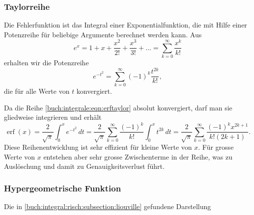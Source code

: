 \subsubsection{Taylorreihe}
Die Fehlerfunktion ist das Integral einer Exponentialfunktion, die mit
Hilfe einer Potenzreihe für beliebige Argumente berechnet werden kann.
Aus
\[
e^x
=
1+x+\frac{x^2}{2!}+\frac{x^3}{3!} + \dots
=
\sum_{k=0}^\infty \frac{x^k}{k!}
\]
erhalten wir die Potenzreihe
\begin{equation}
e^{-t^2}
=
\sum_{k=0}^{\infty}
(-1)^k
\frac{t^{2k}}{k!},
\label{buch:integrale:eqn:erftaylor}
\end{equation}
die für alle Werte von $t$ konvergiert.

Da die Reihe
\eqref{buch:integrale:eqn:erftaylor}
absolut konvergiert, darf man sie gliedweise integrieren und erhält
\begin{equation}
\operatorname{erf}(x)
=
\frac{2}{\sqrt{\pi}}
\int_0^x
e^{-t^2}\,dt
=
\frac{2}{\sqrt{\pi}}
\sum_{k=0}^\infty \frac{(-1)^k}{k!}\int_0^x t^{2k}\,dt
=
\frac{2}{\sqrt{\pi}}
\sum_{k=0}^\infty \frac{(-1)^kx^{2k+1}}{k!(2k+1)}.
\label{buch:integrale:eqn:erfreihe}
\end{equation}
Diese Reihenentwicklung ist sehr effizient für kleine Werte von $x$.
Für grosse Werte von $x$ entstehen aber sehr grosse Zwischenterme in der
Reihe, was zu Auslöschung und damit zu Genauigkeitsverlust führt.

\subsubsection{Hypergeometrische Funktion}
Die in \eqref{buch:integral:risch:subsection:liouville}
gefundene Darstellung

